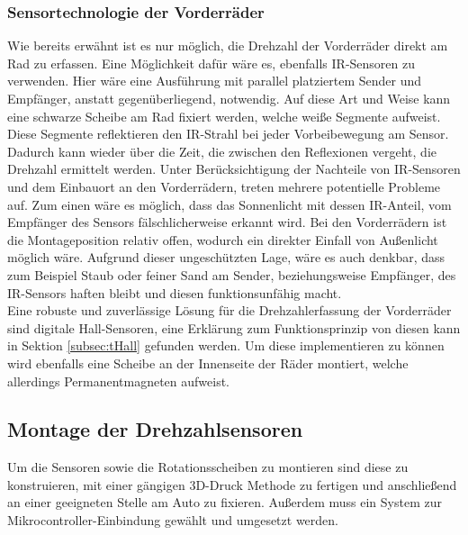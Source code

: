 \subsubsection{Sensortechnologie der Vorderräder}
\label{subsubsec:RPMchoiceFront}
Wie bereits erwähnt ist es nur möglich, die Drehzahl der Vorderräder direkt am Rad zu erfassen. Eine Möglichkeit dafür wäre es, ebenfalls \ac{IR}-Sensoren zu verwenden. Hier wäre eine Ausführung mit parallel platziertem Sender und Empfänger, anstatt gegenüberliegend, notwendig. Auf diese Art und Weise kann eine schwarze Scheibe am Rad fixiert werden, welche weiße Segmente aufweist. Diese Segmente reflektieren den \ac{IR}-Strahl bei jeder Vorbeibewegung am Sensor. Dadurch kann wieder über die Zeit, die zwischen den Reflexionen vergeht, die Drehzahl ermittelt werden. Unter Berücksichtigung der Nachteile von \ac{IR}-Sensoren und dem Einbauort an den Vorderrädern, treten mehrere potentielle Probleme auf. Zum einen wäre es möglich, dass das Sonnenlicht mit dessen \ac{IR}-Anteil, vom Empfänger des Sensors fälschlicherweise erkannt wird. Bei den Vorderrädern ist die Montageposition relativ offen, wodurch ein direkter Einfall von Außenlicht möglich wäre. Aufgrund dieser ungeschützten Lage, wäre es auch denkbar, dass zum Beispiel Staub oder feiner Sand am Sender, beziehungsweise Empfänger, des \ac{IR}-Sensors haften bleibt und diesen funktionsunfähig macht.\\
Eine robuste und zuverlässige Lösung für die Drehzahlerfassung der Vorderräder sind digitale Hall-Sensoren, eine Erklärung zum Funktionsprinzip von diesen kann in Sektion \ref{subsec:tHall} gefunden werden. Um diese implementieren zu können wird ebenfalls eine Scheibe an der Innenseite der Räder montiert, welche allerdings Permanentmagneten aufweist.


\subsection{Montage der Drehzahlsensoren}
\label{subsec:RPMmount}
Um die Sensoren sowie die Rotationsscheiben zu montieren sind diese zu konstruieren, mit einer gängigen 3D-Druck Methode zu fertigen und anschließend an einer geeigneten Stelle am Auto zu fixieren. Außerdem muss ein System zur Mikrocontroller-Einbindung gewählt und umgesetzt werden.

